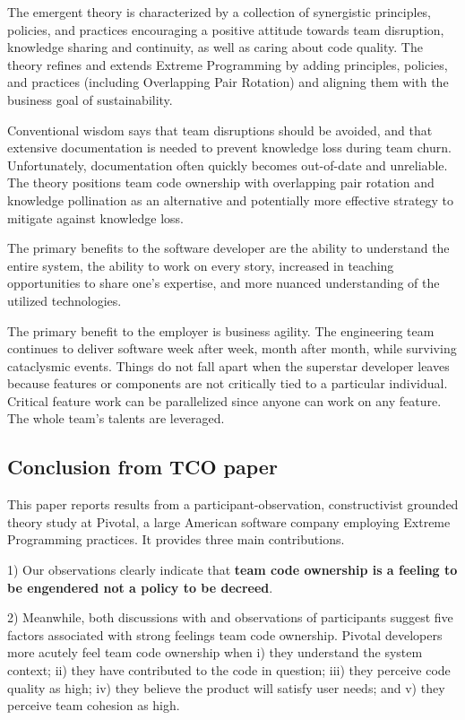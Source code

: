 The emergent theory is characterized by a collection of synergistic principles, policies, and practices encouraging a positive attitude towards team disruption, knowledge sharing and continuity, as well as caring about code quality. The theory refines and extends Extreme Programming by adding principles, policies, and practices (including Overlapping Pair Rotation) and aligning them with the business goal of sustainability.

Conventional wisdom says that team disruptions should be avoided, and that extensive documentation is needed to prevent knowledge loss during team churn. Unfortunately, documentation often quickly becomes out-of-date and unreliable. The theory positions team code ownership with overlapping pair rotation and knowledge pollination as an alternative and potentially more effective strategy to mitigate against knowledge loss.

The primary benefits to the software developer are the ability to understand the entire system, the ability to work on every story, increased in teaching opportunities to share one’s expertise, and more nuanced understanding of the utilized technologies. 

The primary benefit to the employer is business agility. The engineering team continues to deliver software week after week, month after month, while surviving cataclysmic events. Things do not fall apart when the superstar developer leaves because features or components are not critically tied to a particular individual. Critical feature work can be parallelized since anyone can work on any feature.  The whole team’s talents are leveraged.

\subsection{Conclusion from TCO paper}
This paper reports results from a participant-observation, constructivist grounded theory study at Pivotal, a large American software company employing Extreme Programming practices. It provides three main contributions.

1) Our observations clearly indicate that \textbf{team code ownership is a feeling to be engendered not a policy to be decreed}.

2) Meanwhile, both discussions with and observations of participants suggest five factors associated with strong feelings team code ownership. Pivotal developers more acutely feel team code ownership when i) they understand the system context; ii) they have contributed to the code in question; iii) they perceive code quality as high; iv) they believe the product will satisfy user needs; and v) they perceive team cohesion as high.   

